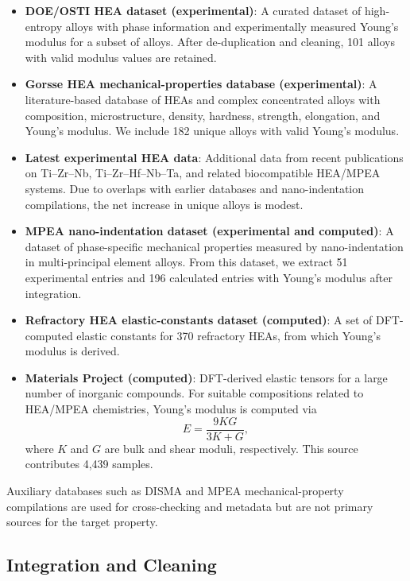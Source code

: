 \documentclass[11pt,a4paper]{article}
\begin{document}
\begin{itemize}
  \item \textbf{DOE/OSTI HEA dataset (experimental)}: A curated dataset of high-entropy alloys with phase information and experimentally measured Young's modulus for a subset of alloys. After de-duplication and cleaning, 101 alloys with valid modulus values are retained.
  \item \textbf{Gorsse HEA mechanical-properties database (experimental)}: A literature-based database of HEAs and complex concentrated alloys with composition, microstructure, density, hardness, strength, elongation, and Young's modulus. We include 182 unique alloys with valid Young's modulus.
  \item \textbf{Latest experimental HEA data}: Additional data from recent publications on Ti--Zr--Nb, Ti--Zr--Hf--Nb--Ta, and related biocompatible HEA/MPEA systems. Due to overlaps with earlier databases and nano-indentation compilations, the net increase in unique alloys is modest.
  \item \textbf{MPEA nano-indentation dataset (experimental and computed)}: A dataset of phase-specific mechanical properties measured by nano-indentation in multi-principal element alloys. From this dataset, we extract 51 experimental entries and 196 calculated entries with Young's modulus after integration.
  \item \textbf{Refractory HEA elastic-constants dataset (computed)}: A set of DFT-computed elastic constants for 370 refractory HEAs, from which Young's modulus is derived.
  \item \textbf{Materials Project (computed)}: DFT-derived elastic tensors for a large number of inorganic compounds. For suitable compositions related to HEA/MPEA chemistries, Young's modulus is computed via
  \begin{equation}
    E = \frac{9KG}{3K + G},
  \end{equation}
  where $K$ and $G$ are bulk and shear moduli, respectively. This source contributes 4{,}439 samples.
\end{itemize}

Auxiliary databases such as DISMA and MPEA mechanical-property compilations are used for cross-checking and metadata but are not primary sources for the target property.

\subsection{Integration and Cleaning}
\end{document}
